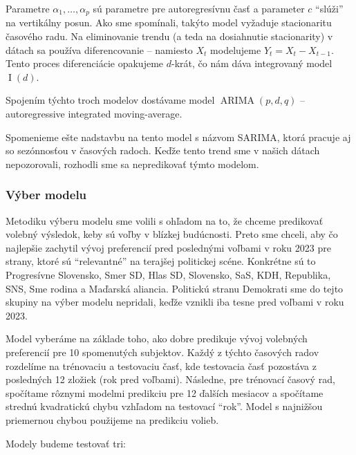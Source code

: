 \documentclass[main.tex]{subfiles}
\begin{document}
Parametre $\alpha_1,\dots,\alpha_p$ sú parametre pre autoregresívnu časť a parameter $c$ \enquote{slúži} na vertikálny posun. Ako sme spomínali, takýto model vyžaduje stacionaritu časového radu. Na eliminovanie trendu (a teda na dosiahnutie stacionarity) v dátach sa používa diferencovanie -- namiesto $X_t$ modelujeme $Y_t = X_t - X_{t-1}$. Tento proces diferenciácie opakujeme $d$-krát, čo nám dáva integrovaný model $\operatorname{I}(d)$. 

Spojením týchto troch modelov dostávame model $\operatorname{ARIMA}(p,d,q)$ -- autoregressive integrated moving-average.

Spomenieme ešte nadstavbu na tento model s názvom SARIMA, ktorá pracuje aj so sezónnosťou v časových radoch. Keďže tento trend sme v našich dátach nepozorovali, rozhodli sme sa nepredikovať týmto modelom. 

\subsubsection{Výber modelu}

Metodiku výberu modelu sme volili s ohľadom na to, že chceme predikovať volebný výsledok, keby sú voľby v blízkej budúcnosti. Preto sme chceli, aby čo najlepšie zachytil vývoj preferencií pred poslednými voľbami v roku 2023 pre strany, ktoré sú \enquote{relevantné} na terajšej politickej scéne. Konkrétne sú to Progresívne Slovensko, Smer SD, Hlas SD, Slovensko, SaS, KDH, Republika, SNS, Sme rodina a Maďarská aliancia. Politickú stranu Demokrati sme do tejto skupiny na výber modelu nepridali, keďže vznikli iba tesne pred voľbami v roku 2023. 

Model vyberáme na základe toho, ako dobre predikuje vývoj volebných preferencií pre 10 spomenutých subjektov. Každý z týchto časových radov rozdelíme na trénovaciu a testovaciu časť, kde testovacia časť pozostáva z posledných 12 zložiek (rok pred voľbami). Následne, pre trénovací časový rad, spočítame rôznymi modelmi predikciu pre 12 ďalších mesiacov a spočítame strednú kvadratickú chybu vzhľadom na testovací \enquote{rok}. Model s najnižšou priemernou chybou použijeme na predikciu volieb. 

\newpage

Modely budeme testovať tri:
\end{document}
